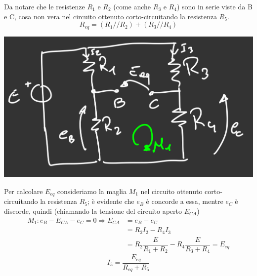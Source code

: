 \documentclass{article}
\begin{document}
Da notare che le resistenze $R_1$ e $R_2$ (come anche $R_3$ e $R_4$) sono in serie viste da B e C, cosa non vera nel circuito ottenuto corto-circuitando la resistenza $R_5$.
\[
    R_{eq} = (R_1//R_2) + (R_3//R_4)
\]
\begin{center}
    \includegraphics[scale=0.3]{Image/Esercizio_Thevenin_4.png}
\end{center}
Per calcolare $E_{eq}$ consideriamo la maglia $M_1$ nel circuito ottenuto corto-circuitando la resistenza $R_5$; è evidente che $e_B$ è concorde a essa, mentre $e_C$ è discorde, quindi (chiamando la tensione del circuito aperto $E_{CA}$)
\begin{align*}
    M_1: e_B - E_{CA} - e_C= 0 \Longrightarrow E_{CA} &= e_B - e_C\\
    &= R_2I_2 - R_4I_3\\
    &=R_2 \dfrac{E}{R_1+R_2} - R_4 \dfrac{E}{R_3+R_4} = E_{eq}
\end{align*}
\[
    I_5 = \frac{E_{eq}}{R_{eq}+R_5}
\]
\end{document}
